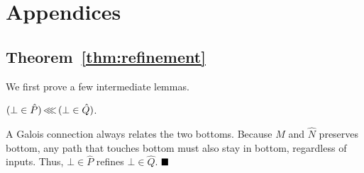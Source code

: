 \section{Appendices}

\subsection{Theorem~\ref{thm:refinement}}

We first prove a few intermediate lemmas.







\begin{lemma} \label{lem:bot-refine-bot}
$(\bot \in \hat P) \operatorname{\lll} \, (\bot \in \hat Q)$.
\end{lemma}

A Galois connection always relates the two bottoms. Because $\hat M$ and $\hat N$ preserves bottom, any path that touches bottom must also stay in bottom, regardless of inputs. Thus, $\bot \in \hat P$ refines $\bot \in \hat Q$. $\qedb$

